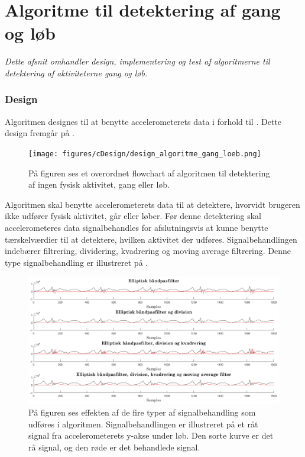 \section{Algoritme til detektering af gang og løb}\label{sec:algogangloeb}
\textit{Dette afsnit omhandler design, implementering og test af algoritmerne til detektering af aktiviteterne gang og løb.} 

\subsubsection{Design} \label{design_algo_g_l}
Algoritmen designes til at benytte accelerometerets data i forhold til . Dette design fremgår på .
\begin{figure}[H]
	\centering
	\texttt{[image: figures/cDesign/design\_algoritme\_gang\_loeb.png]}
	\caption{På figuren ses et overordnet flowchart af algoritmen til detektering af ingen fysisk aktivitet, gang eller løb.}
	\label{fig:design_algoritme_gang_loeb}
\end{figure}\vspace{-0.25cm}
Algoritmen skal benytte accelerometerets data til at detektere, hvorvidt brugeren ikke udfører fysisk aktivitet, går eller løber. Før denne detektering skal accelerometeres data signalbehandles for afslutningsvis at kunne benytte tærskelværdier til at detektere, hvilken aktivitet der udføres. Signalbehandlingen indebærer filtrering, dividering, kvadrering og moving average filtrering. Denne type signalbehandling er illustreret på .
\begin{figure}[H]
	\centering
	\includegraphics[width=1\textwidth]{figures/cDesign/signalbehandling_psoc.png}
	\caption{På figuren ses effekten af de fire typer af signalbehandling som udføres i algoritmen. Signalbehandlingen er illustreret på et råt signal fra accelerometerets y-akse under løb. Den sorte kurve er det rå signal, og den røde er det behandlede signal.}
	\label{fig:algoritme_behandling}
\end{figure}\vspace{-0.25cm}

